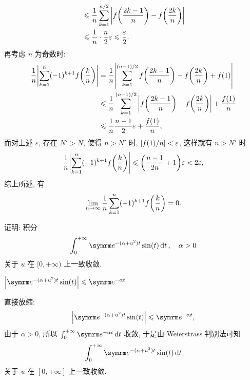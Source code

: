 \begin{exercise}[series=exer]
\begin{answer}
\begin{align*}
      & \leqslant \frac{1}{n}\sum_{k = 1}^{n/2}\abs{f\qty(\frac{2k-1}{n}) - f\qty(\frac{2k}{n})} \\
      & \leqslant \frac{1}{n}\cdot\frac{n}{2}\varepsilon \leqslant \frac{\varepsilon}{2}.
    \end{align*}
    再考虑 $ n $ 为奇数时:
    \begin{align*}
        \frac{1}{n} \abs{\sum_{k=1}^{n} (-1)^{k+1} f\qty(\frac{k}{n})} 
        & = \frac{1}{n}\abs{\sum_{k = 1}^{(n - 1)/2}f\qty(\frac{2k-1}{n}) - f\qty(\frac{2k}{n}) + f(1)} \\
        & \leqslant \frac{1}{n}\sum_{k = 1}^{(n - 1)/2}\abs{f\qty(\frac{2k-1}{n}) - f\qty(\frac{2k}{n})} + \frac{f(1)}{n} \\
        & \leqslant \frac{1}{n} \frac{n - 1}{2} \varepsilon + \frac{f(1)}{n},
    \end{align*}
    而对上述 $ \varepsilon $, 存在 $ N' > N $, 使得 $ n > N' $ 时, $ \abs{f(1)/n} < \varepsilon $, 这样就有 $ n > N' $ 时
    \begin{align*}
        \frac{1}{n} \abs{\sum_{k=1}^{n} (-1)^{k+1} f\qty(\frac{k}{n})} \leqslant \qty(\frac{n - 1}{2n} + 1) \varepsilon < 2 \varepsilon,
    \end{align*}
    综上所述, 有
    \begin{align*}
        \lim_{n \to \infty} \frac{1}{n} \sum_{k=1}^{n} (-1)^{k+1} f\qty(\frac{k}{n}) = 0.
    \end{align*}
  \end{answer}
  \item 证明: 积分
  \begin{align*}
      \int_{0}^{+\infty} \me^{-(\alpha + u^{2})t} \sin(t) \dd{t},\quad \alpha > 0
  \end{align*}
  关于 $ u $ 在 $ [0, +\infty) $ 上一致收敛.
  \begin{hint}
      $ \abs{\me^{-(\alpha + u^{2})t} \sin(t)} \le \me^{-\alpha t} $
  \end{hint}
  \begin{answer}
      直接放缩:
      \begin{align*}
          \abs{\me^{-(\alpha + u^{2})t} \sin(t)} \le \me^{-\alpha t},
      \end{align*}
      由于 $ \alpha > 0 $, 所以 $ \int_{0}^{+\infty} \me^{-\alpha t} \dd{t} $ 收敛, 于是由 Weierstrass 判别法可知
      \begin{align*}
          \int_{0}^{+\infty} \me^{-(\alpha + u^{2}) t} \sin(t) \dd{t}
      \end{align*}
      关于 $ u $ 在 $ [0, +\infty] $ 上一致收敛.
  \end{answer}

\end{exercise}
